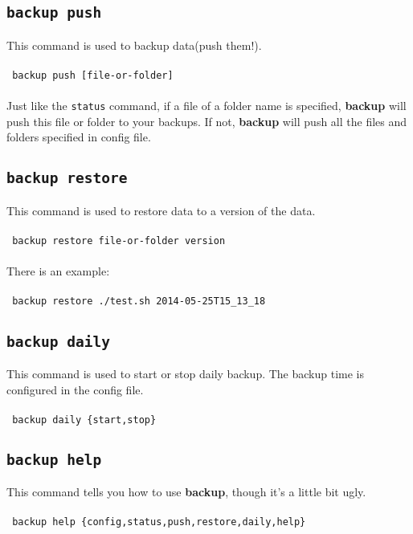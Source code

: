 \documentclass[a4paper]{article}
\begin{document}
\subsection{{\large\tt backup push}}
This command is used to backup data(push them!). \\
\\
{\tt
    backup push [file-or-folder]
} \\
\\
Just like the {\large\tt status} command, if a file of a folder name is specified, \textbf{backup} will push this file or folder to your backups. If not, \textbf{backup} will push all the files and folders specified in config file.

\subsection{{\large\tt backup restore}}
This command is used to restore data to a version of the data. \\
\\
{\tt
    backup restore file-or-folder version
} \\
\\
There is an example: \\
\\
{\tt
    backup restore ./test.sh 2014-05-25T15\_13\_18
}

\subsection{{\large\tt backup daily}}
This command is used to start or stop daily backup. The backup time is configured in the config file. \\
\\
{\tt
    backup daily \{start,stop\}
}

\subsection{{\large\tt backup help}}
This command tells you how to use \textbf{backup}, though it's a little bit ugly. \\
\\
{\tt
    backup help \{config,status,push,restore,daily,help\}
}
\end{document}
